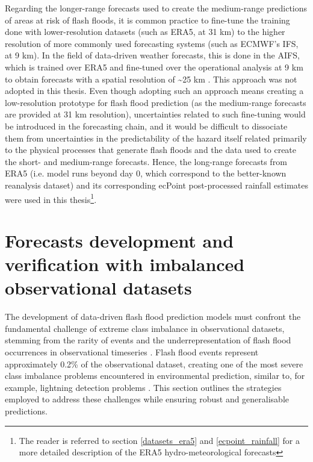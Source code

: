 Regarding the longer-range forecasts used to create the medium-range predictions of areas at risk of flash floods, it is common practice to fine-tune the training done with lower-resolution datasets (such as ERA5, at 31 km) to the higher resolution of more commonly used forecasting systems (such as ECMWF's IFS, at 9 km). In the field of data-driven weather forecasts, this is done in the AIFS, which is trained over ERA5 and fine-tuned over the operational analysis at 9 km to obtain forecasts with a spatial resolution of \sim25 km  \citep{Lang_2024}. This approach was not adopted in this thesis. Even though adopting such an approach means creating a low-resolution prototype for flash flood prediction (as the medium-range forecasts are provided at 31 km resolution), uncertainties related to such fine-tuning would be introduced in the forecasting chain, and it would be difficult to dissociate them from uncertainties in the predictability of the hazard itself related primarily to the physical processes that generate flash floods and the data used to create the short- and medium-range forecasts. Hence, the long-range forecasts from ERA5 (i.e. model runs beyond day 0, which correspond to the better-known reanalysis dataset) and its corresponding ecPoint post-processed rainfall estimates were used in this thesis\footnote{The reader is referred to section \ref{datasets_era5} and \ref{ecpoint_rainfall} for a more detailed description of the ERA5 hydro-meteorological forecasts}. 


\section{Forecasts development and verification with imbalanced observational datasets}
\label{experimental_design_model_dev_imbalanced_data}

The development of data-driven flash flood prediction models must confront the fundamental challenge of extreme class imbalance in observational datasets, stemming from the rarity of events and the underrepresentation of flash flood occurrences in observational timeseries \citep{Gaume_2009, Panwar_2020, Marjerison_2016}. Flash flood events represent approximately 0.2\% of the observational dataset, creating one of the most severe class imbalance problems encountered in environmental prediction, similar to, for example, lightning detection problems \citep{Cavaiola_2024}. This section outlines the strategies employed to address these challenges while ensuring robust and generalisable predictions.

